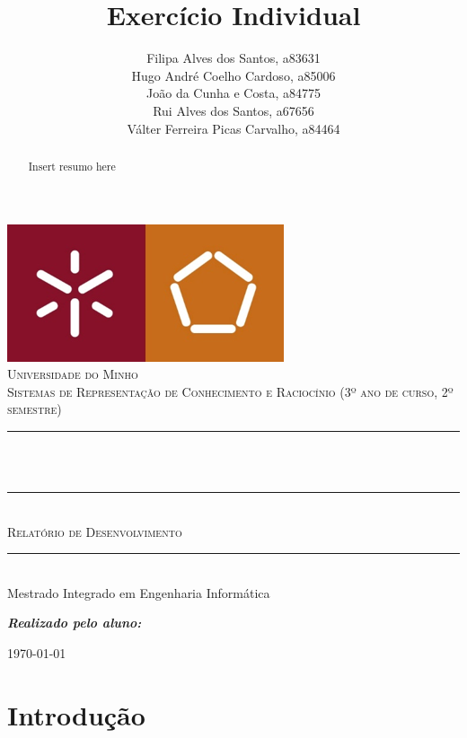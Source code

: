 \documentclass[11pt, a4paper, titlepage]{article}
\title{\textbf{Exercício Individual}}
\author{
    Filipa Alves dos Santos, a83631 \\
    Hugo André Coelho Cardoso, a85006 \\
    João da Cunha e Costa, a84775 \\
    Rui Alves dos Santos, a67656 \\
    Válter Ferreira Picas Carvalho, a84464}
\begin{document}
\begin{titlepage}
\centering
\includegraphics{UM.png}\\[1 cm]

\textsc{\LARGE Universidade do Minho}\\[1.5 cm]

\textsc{\Large Sistemas de Representação de Conhecimento e Raciocínio (3º ano de curso, 2º semestre)}\\[0.5 cm]

\rule{\linewidth}{0.2 mm} \\[0.7 cm]
{\huge \bfseries \thetitle}\\[0.6 cm]
\rule{\linewidth}{0.2 mm} \\[1 cm]

\textsc{\LARGE Relatório de Desenvolvimento}\\[0.9 cm]\par

\rule{\linewidth}{0.2 mm} \\[1.5 cm]

Mestrado Integrado em Engenharia Informática\par
\vfill
\vfill

\RaggedLeft
\emph{\textbf{Realizado pelo aluno:}}  
\par \theauthor \par 

\Centering
\vfill
	\today
\end{titlepage}


\begin{abstract}
Insert resumo here
\end{abstract}

\begin{spacing}{1}
\tableofcontents
\cleardoublepage
\listoffigures
\end{spacing}

\section[Introdução]{\LARGE Introdução} \label{sec1}

\end{document}
